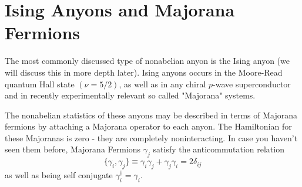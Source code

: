 \documentclass{book}
\begin{document}
\section{Ising Anyons and Majorana Fermions}
The most commonly discussed type of nonabelian anyon is the Ising anyon (we will discuss this in more depth later). Ising anyons occurs in the Moore-Read quantum Hall state $(\nu =5/2)$, as well as in any chiral $p$-wave superconductor and in recently experimentally relevant so called "Majorana" systems.

The nonabelian statistics of these anyons may be described in terms of Majorana fermions by attaching a Majorana operator to each anyon. The Hamiltonian for these Majoranas is zero - they are completely noninteracting. In case you haven't seen them before, Majorana Fermions $\gamma _{j}$ satisfy the anticommutation relation
\begin{equation*}
\{\gamma _{i} ,\gamma _{j}\} \equiv \gamma _{i} \gamma _{j} +\gamma _{j} \gamma _{i} =2\delta _{ij}
\end{equation*}
as well as being self conjugate $\gamma _{i}^{\dagger } =\gamma _{i}$.
\end{document}
